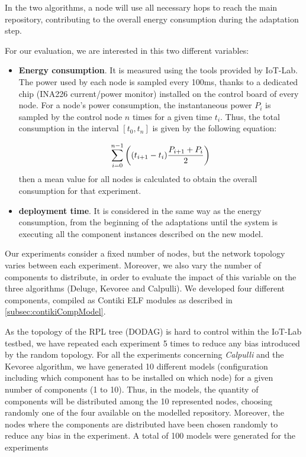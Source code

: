 In the two algorithms, a node will use all necessary hops to reach the main repository, contributing to the overall energy consumption during the adaptation step.

For our evaluation, we are interested in this two different variables:
\begin{itemize}
	\item\textbf{Energy consumption}.
	It is measured using the tools provided by IoT-Lab. 
	The power used by each node is sampled every 100ms, thanks to a dedicated chip (INA226 current/power monitor) installed on the control board of every node.
	For a node's power consumption, the instantaneous power $P_i$ is sampled by the control node $n$ times for a given time $t_i$.
	Thus, the total consumption in the interval $\left[t_0, t_n\right]$ is given by the following equation:
	
	\begin{equation}
	\hspace*{\stretch{1}}
		\sum_{i=0}^{n-1}{\left( (t_{i+1} - t_i) \frac{P_{i+1} + P_i}{2} \right)}
	\hspace*{\stretch{1}}
	\end{equation}
	then a mean value for all nodes is calculated to obtain the overall consumption for that experiment.
	\item\textbf{deployment time}.
	It is considered in the same way as the energy consumption, from the beginning of the adaptations until the system is executing all the component instances described on the new model.
\end{itemize}

Our experiments consider a fixed number of nodes, but the network topology varies between each experiment.
Moreover, we also vary the number of components to distribute, in order to evaluate the impact of this variable on the three algorithms (Deluge, Kevoree and Calpulli).
We developed four different components, compiled as Contiki ELF modules as described in \ref{subsec:contikiCompModel}.

As the topology of the RPL tree (DODAG) is hard to control within the IoT-Lab testbed, we have repeated each experiment 5 times to reduce any bias introduced by the random topology.
For all the experiments concerning \textit{Calpulli} and the Kevoree algorithm, we have generated 10 different models (configuration including which component has to be installed on which node) for a given number of components (1 to 10).
Thus, in the models, the quantity of components will be distributed among the 10 represented nodes, choosing randomly one of the four available on the modelled repository.
Moreover, the nodes where the components are distributed have been chosen randomly to reduce any bias in the experiment.
A total of 100 models were generated for the experiments

